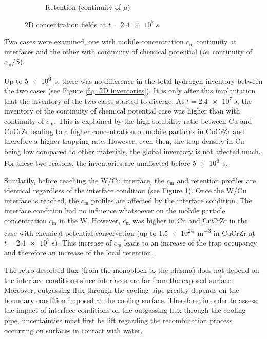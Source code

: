 \begin{figure}
\begin{subfigure}{0.5\linewidth}
        \caption{Retention (continuity of $\mu$)}
    \end{subfigure}
    \caption{2D concentration fields at $t=\SI{2.4e7}{s}$}
    \label{fig: concentrations fields 2d}
\end{figure}
Two cases were examined, one with mobile concentration $c_\mathrm{m}$ continuity at interfaces and the other with continuity of chemical potential (\textit{ie.} continuity of $c_\mathrm{m}/S$).

Up to \SI{5e6}{s}, there was no difference in the total hydrogen inventory between the two cases (see Figure \ref{fig: 2D inventories}).
It is only after this implantation that the inventory of the two cases started to diverge.
At $t=\SI{2.4e7}{s}$, the inventory of the continuity of chemical potential case was higher than with continuity of $c_\mathrm{m}$.
This is explained by the high solubility ratio between Cu and CuCrZr leading to a higher concentration of mobile particles in CuCrZr and therefore a higher trapping rate.
However, even then, the trap density in Cu being low compared to other materials, the global inventory is not affected much.
For these two reasons, the inventories are unaffected before \SI{5e6}{s}.

Similarily, before reaching the W/Cu interface, the $c_\mathrm{m}$ and retention profiles are identical regardless of the interface condition (see Figure \ref{fig: concentrations fields 2d}).
Once the W/Cu interface is reached, the $c_\mathrm{m}$ profiles are affected by the interface condition.
The interface condition had no influence whatsoever on the mobile particle concentration $c_\mathrm{m}$ in the W.
However, $c_\mathrm{m}$ was higher in Cu and CuCrZr in the case with chemical potential conservation (up to \SI{1.5e24}{m^{-3}} in CuCrZr at $t=\SI{2.4e7}{s}$).
This increase of $c_\mathrm{m}$ leads to an increase of the trap occupancy and therefore an increase of the local retention.

The retro-desorbed flux (from the monoblock to the plasma) does not depend on the interface conditions since interfaces are far from the exposed surface.
Moreover, outgassing flux through the cooling pipe greatly depends on the boundary condition imposed at the cooling surface.
Therefore, in order to assess the impact of interface conditions on the outgassing flux through the cooling pipe, uncertainties must first be lift regarding the recombination process occurring on surfaces in contact with water.


